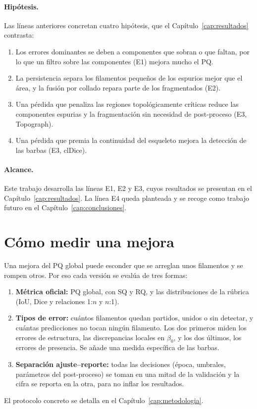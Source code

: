 \paragraph{Hipótesis.} Las líneas anteriores concretan cuatro hipótesis,
que el Capítulo~\ref{cap:resultados} contrasta:
\begin{enumerate}
  \item[H1.] Los errores dominantes se deben a componentes que sobran o
  que faltan, por lo que un filtro sobre las componentes (E1) mejora
  mucho el PQ.
  \item[H2.] La persistencia separa los filamentos pequeños de los
  espurios mejor que el área, y la fusión por collado repara parte de
  los fragmentados (E2).
  \item[H3.] Una pérdida que penaliza las regiones topológicamente
  críticas reduce las componentes espurias y la fragmentación sin
  necesidad de post-proceso (E3, Topograph).
  \item[H4.] Una pérdida que premia la continuidad del esqueleto mejora
  la detección de las barbas (E3, clDice).
\end{enumerate}

\paragraph{Alcance.} Este trabajo desarrolla las líneas E1, E2 y E3,
cuyos resultados se presentan en el Capítulo~\ref{cap:resultados}. La
línea E4 queda planteada y se recoge como trabajo futuro en el
Capítulo~\ref{cap:conclusiones}.

\section{Cómo medir una mejora}
\label{sec:medir}

Una mejora del PQ global puede esconder que se arreglan unos filamentos
y se rompen otros. Por eso cada versión se evalúa de tres formas:
\begin{enumerate}
  \item \textbf{Métrica oficial:} PQ global, con SQ y RQ, y las
  distribuciones de la rúbrica (IoU, Dice y relaciones 1:$n$ y $n$:1).
  \item \textbf{Tipos de error:} cuántos filamentos quedan partidos,
  unidos o sin detectar, y cuántas predicciones no tocan ningún
  filamento. Los dos primeros miden los errores de estructura, las
  discrepancias locales en $\beta_0$, y los dos últimos, los errores de
  presencia. Se añade una medida específica de las barbas.
  \item \textbf{Separación ajuste--reporte:} todas las decisiones (época,
  umbrales, parámetros del post-proceso) se toman en una mitad de la
  validación y la cifra se reporta en la otra, para no inflar los
  resultados.
\end{enumerate}
El protocolo concreto se detalla en el Capítulo~\ref{cap:metodologia}.
